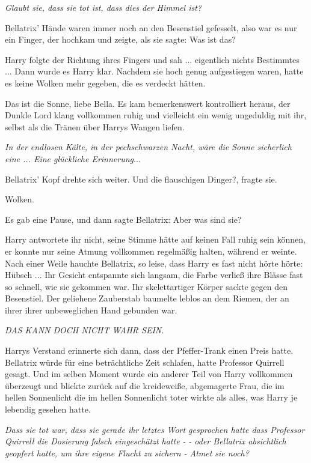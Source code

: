 \emph{Glaubt sie, dass sie tot ist, dass dies der Himmel ist?}

Bellatrix' Hände waren immer noch an den Besenstiel gefesselt, also war es nur
ein Finger, der hochkam und zeigte, als sie sagte: \glqq{}Was ist das?\grqq{}

Harry folgte der Richtung ihres Fingers und sah ... eigentlich nichts
Bestimmtes ... Dann wurde es Harry klar. Nachdem sie hoch genug aufgestiegen
waren, hatte es keine Wolken mehr gegeben, die es verdeckt hätten.

\glqq{}Das ist die Sonne, liebe Bella.\grqq{} Es kam bemerkenswert kontrolliert
heraus, der Dunkle Lord klang vollkommen ruhig und vielleicht ein wenig
ungeduldig mit ihr, selbst als die Tränen über Harrys Wangen liefen.

\emph{In der endlosen Kälte, in der pechschwarzen Nacht, wäre die Sonne
sicherlich eine ... Eine glückliche Erinnerung}...

Bellatrix' Kopf drehte sich weiter. \glqq{}Und die flauschigen Dinger?\grqq{},
fragte sie.

\glqq{}Wolken.\grqq{}

Es gab eine Pause, und dann sagte Bellatrix: \glqq{}Aber was sind sie?\grqq{}

Harry antwortete ihr nicht, seine Stimme hätte auf keinen Fall ruhig sein
können, er konnte nur seine Atmung vollkommen regelmäßig halten, während er
weinte. Nach einer Weile hauchte Bellatrix, so leise, dass Harry es fast nicht
hörte hörte: \glqq{}Hübsch ...\grqq{} Ihr Gesicht entspannte sich langsam, die
Farbe verließ ihre Blässe fast so schnell, wie sie gekommen war. Ihr
skelettartiger Körper sackte gegen den Besenstiel. Der geliehene Zauberstab
baumelte leblos an dem Riemen, der an ihrer ihrer unbeweglichen Hand gebunden
war.

\emph{DAS KANN DOCH NICHT WAHR SEIN.}

Harrys Verstand erinnerte sich dann, dass der Pfeffer-Trank einen Preis hatte.
Bellatrix würde für eine beträchtliche Zeit schlafen, hatte Professor Quirrell
gesagt. Und im selben Moment wurde ein anderer Teil von Harry vollkommen
überzeugt und blickte zurück auf die kreideweiße, abgemagerte Frau, die im
hellen Sonnenlicht die im hellen Sonnenlicht toter wirkte als alles, was Harry
je lebendig gesehen hatte.

\emph{Dass sie tot war, dass sie gerade ihr letztes Wort gesprochen hatte dass
Professor Quirrell die Dosierung falsch eingeschätzt hatte -} \emph{- oder
Bellatrix absichtlich geopfert hatte, um ihre eigene Flucht zu sichern}
\emph{- Atmet sie noch?}

